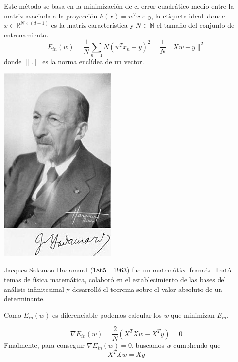 \documentclass[11pt,twoside,titlepage,a4paper]{article}
\numberwithin{equation}{section} %
\theoremstyle{usual}
\begin{document}
    Este método se basa en la minimización de el error cuadrático medio entre la matriz asociada a la proyección $h(x) = w^T x$ e $y$, la etiqueta ideal, donde $x \in \mathbb R^{N \times (d+1)}$ es la matriz característica y $N \in \mathbb N$ el tamaño del conjunto de entrenamiento. \\

    \begin{equation}
      E_{in}(w) = \frac{1}{N} \sum_{n=1}{N} (w^T x_n - y)^2 
      = \frac{1}{N} \| Xw -y \|^2 
    \end{equation}
    donde $\|.\|$ es la norma euclídea de un vector. \\

\begin{marginfigure}
        \includegraphics[width=0.5\marginparwidth]{Source/images/hadamard.jpg}
        \caption{ \scriptsize Jacques Salomon Hadamard (1865 - 1963) \cite{hadamard-wikipedia} fue un matemático francés. Trató temas de física matemática, colaboró en el establecimiento de las bases del análisis infinitesimal y desarrolló el teorema sobre el valor absoluto de un determinante.}
    \end{marginfigure}
    
    Como $E_{in}(w)$ es diferenciable podemos calcular los $w$ que minimizan  $E_{in}$.

    \begin{equation}
    \nabla E_{in}(w) = \frac{2}{N}(X^TXw - X^T y) =0
    \end{equation}
    Finalmente, para conseguir $\nabla  E_{in}(w) = 0$, buscamos $w$ cumpliendo que
    \begin{equation}
        X^TXw = X y
    \end{equation}
\end{document}
